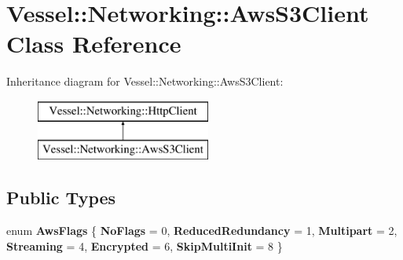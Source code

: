 \hypertarget{class_vessel_1_1_networking_1_1_aws_s3_client}{}\section{Vessel\+:\+:Networking\+:\+:Aws\+S3\+Client Class Reference}
\label{class_vessel_1_1_networking_1_1_aws_s3_client}
Inheritance diagram for Vessel\+:\+:Networking\+:\+:Aws\+S3\+Client\+:\begin{figure}[H]
\begin{center}
\leavevmode
\includegraphics[height=2.000000cm]{class_vessel_1_1_networking_1_1_aws_s3_client}
\end{center}
\end{figure}
\subsection*{Public Types}
\begin{DoxyCompactItemize}
\item 
\mbox{\label{class_vessel_1_1_networking_1_1_aws_s3_client_a0dd37e7d17b27a7772cc0534c5bd5537}} 
enum {\bfseries Aws\+Flags} \{ \newline
{\bfseries No\+Flags} = 0, 
{\bfseries Reduced\+Redundancy} = 1, 
{\bfseries Multipart} = 2, 
{\bfseries Streaming} = 4, 
\newline
{\bfseries Encrypted} = 6, 
{\bfseries Skip\+Multi\+Init} = 8
 \}
\end{DoxyCompactItemize}

